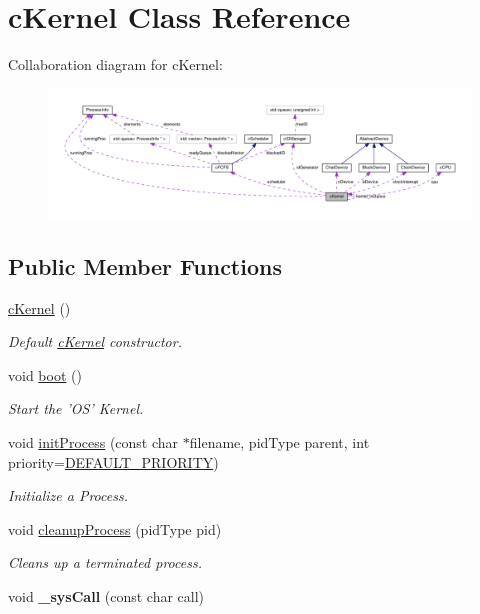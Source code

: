\hypertarget{classcKernel}{\section{c\-Kernel \-Class \-Reference}
\label{db/da5/classcKernel}
}


\-Collaboration diagram for c\-Kernel\-:\nopagebreak
\begin{figure}[H]
\begin{center}
\leavevmode
\includegraphics[width=350pt]{d4/d6f/classcKernel__coll__graph}
\end{center}
\end{figure}
\subsection*{\-Public \-Member \-Functions}
\begin{DoxyCompactItemize}
\item 
\hyperlink{classcKernel_a64d105a595a4d14a47bb65426b331159}{c\-Kernel} ()
\begin{DoxyCompactList}\small\item\em \-Default \hyperlink{classcKernel}{c\-Kernel} constructor. \end{DoxyCompactList}\item 
void \hyperlink{classcKernel_a0ce9a2721bb1ea4d7f999198634f702d}{boot} ()
\begin{DoxyCompactList}\small\item\em \-Start the '\-O\-S' \-Kernel. \end{DoxyCompactList}\item 
void \hyperlink{classcKernel_a5440eace2647ffd5279de55600947b84}{init\-Process} (const char $\ast$filename, pid\-Type parent, int priority=\hyperlink{kernel_8h_a0756f011ef667460d583017366823244}{\-D\-E\-F\-A\-U\-L\-T\-\_\-\-P\-R\-I\-O\-R\-I\-T\-Y})
\begin{DoxyCompactList}\small\item\em \-Initialize a \-Process. \end{DoxyCompactList}\item 
void \hyperlink{classcKernel_a1e7cb5c6d9e6140e197f9b18dc8bd1b1}{cleanup\-Process} (pid\-Type pid)
\begin{DoxyCompactList}\small\item\em \-Cleans up a terminated process. \end{DoxyCompactList}\item 
\hypertarget{classcKernel_acdaa8be94f13fcb1f11b3bf90bc316fa}{void {\bfseries \-\_\-sys\-Call} (const char call)}\label{db/da5/classcKernel_acdaa8be94f13fcb1f11b3bf90bc316fa}

\end{DoxyCompactItemize}
